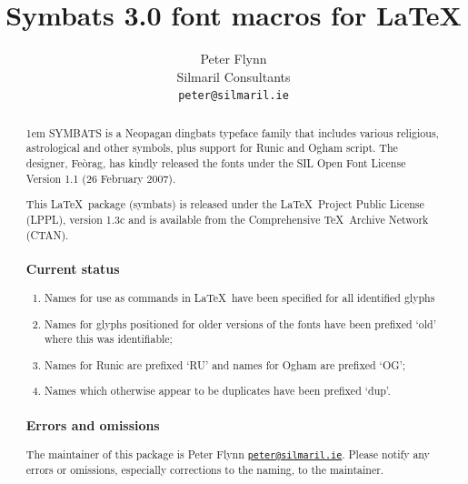 \documentclass{article}
\begin{document}
\title{Symbats 3.0 font macros for \LaTeX}
\author{Peter Flynn\\Silmaril Consultants\\\texttt{peter@silmaril.ie}}
\maketitle
\begin{center}
\begin{minipage}{.75\textwidth}
\begin{abstract}\onehalfspacing\raggedright\parindent1em\noindent
{S\smaller YMBATS} is a Neopagan dingbats typeface family that includes
various religious, astrological and other symbols, plus support for
Runic and Ogham script. The designer, Feòrag, has kindly released the
fonts under the SIL Open Font License Version 1.1 (26 February 2007).

This \LaTeX\ package (\textsf{symbats}) is released under the
\LaTeX\ Project Public License (LPPL), version 1.3c and is available
from the Comprehensive \TeX\ Archive Network (CTAN).

\subsubsection*{Current status}
\begin{enumerate}
  \item Names for use as commands in \LaTeX\ have been specified for
    all identified glyphs
  \item Names for glyphs positioned for older versions of the fonts
    have been prefixed `old' where this was identifiable;
  \item Names for Runic are prefixed `RU' and names for Ogham are
    prefixed `OG';
  \item Names which otherwise appear to be duplicates have been
    prefixed `dup'.
\end{enumerate}
\subsubsection*{Errors and omissions}
The maintainer of this package is Peter Flynn
\href{mailto:peter@silmaril.ie}{\nolinkurl{peter@silmaril.ie}}. Please
notify any errors or omissions, especially corrections to the naming,
to the maintainer.
\end{abstract}
\tableofcontents

\end{minipage}
\end{center}
\end{document}
